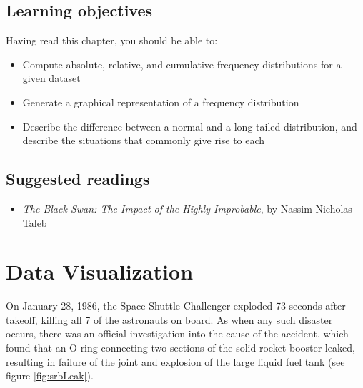 \documentclass[
  12pt,
]{book}
\providecommand{\tightlist}{%
  \setlength{\itemsep}{0pt}\setlength{\parskip}{0pt}}
\begin{document}
\hypertarget{learning-objectives-2}{%
\section{Learning objectives}\label{learning-objectives-2}}

Having read this chapter, you should be able to:

\begin{itemize}
\tightlist
\item
  Compute absolute, relative, and cumulative frequency distributions for a given dataset
\item
  Generate a graphical representation of a frequency distribution
\item
  Describe the difference between a normal and a long-tailed distribution, and describe the situations that commonly give rise to each
\end{itemize}

\hypertarget{suggested-readings-2}{%
\section{Suggested readings}\label{suggested-readings-2}}

\begin{itemize}
\tightlist
\item
  \emph{The Black Swan: The Impact of the Highly Improbable}, by Nassim Nicholas Taleb
\end{itemize}

\hypertarget{data-visualization}{%
\chapter{Data Visualization}\label{data-visualization}}

On January 28, 1986, the Space Shuttle Challenger exploded 73 seconds after takeoff, killing all 7 of the astronauts on board. As when any such disaster occurs, there was an official investigation into the cause of the accident, which found that an O-ring connecting two sections of the solid rocket booster leaked, resulting in failure of the joint and explosion of the large liquid fuel tank (see figure \ref{fig:srbLeak}).
\end{document}
